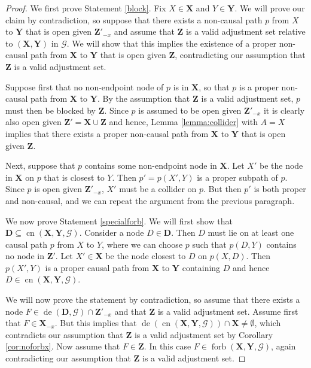 \documentclass[11pt,a4paper]{article}
\theoremstyle{definition}
\theoremstyle{remark}
\DeclareMathOperator{\Forbb}{forb}
\DeclareMathOperator{\de}{de}
\DeclareMathOperator{\CN}{cn}
\newcommand{\g}[1][G]{\mathcal{#1}}
\newcommand{\fb}[2][X,Y]{\Forbb(\mathbf{#1},#2)}
\newcommand{\cnb}[2][X,Y]{\CN(\mathbf{#1},#2)}
\begin{document}
\begin{proof}
	We first prove Statement \ref{block}. Fix $X \in \mathbf{X}$ and $Y \in \mathbf{Y}$. We will prove our claim by contradiction, so suppose that there exists a non-causal path $p$ from $X$ to $\mathbf{Y}$ that is open given $\mathbf{Z'}_{-x}$ and assume that $\mathbf{Z}$ is a valid adjustment set relative to $(\mathbf{X,Y})$ in $\g$. We will show that this implies the existence of a proper non-causal path from $\mathbf{X}$ to $\mathbf{Y}$ that is open given $\mathbf{Z}$, contradicting our assumption that $\mathbf{Z}$ is a valid adjustment set.
	
	Suppose first that no non-endpoint node of $p$ is in $\mathbf{X}$, so that $p$ is a proper non-causal path from $\mathbf{X}$ to $\mathbf{Y}$. By the assumption that $\mathbf{Z}$ is a valid adjustment set, $p$ must then be blocked by $\mathbf{Z}$. Since $p$ is assumed to be open given $\mathbf{Z'}_{-x}$ it is clearly also open given $\mathbf{Z'}=\mathbf{X} \cup \mathbf{Z}$ and hence, Lemma \ref{lemma:collider} with $A=X$ implies that there exists a proper non-causal path from $\mathbf{X}$ to $\mathbf{Y}$ that is open given $\mathbf{Z}$.
	
	Next, suppose that $p$ contains some non-endpoint node in $\mathbf{X}$. Let $X'$ be the node in $\mathbf{X}$ on $p$ that is closest to $Y$. Then $p'=p(X',Y)$ is a proper subpath of $p$. Since $p$ is open given $\mathbf{Z'}_{-x}$, $X'$ must be a collider on $p$. But then $p'$ is both proper and non-causal, and we can repeat the argument from the previous paragraph.  
	
	
	We now prove Statement \ref{specialforb}. We will first show that $\mathbf{D} \subseteq \cnb{\g}$. Consider a node $D \in \mathbf{D}$. Then $D$ must lie on at least one causal path $p$ from $X$ to $Y$, where we can choose $p$ such that $p(D,Y)$ contains no node in $\mathbf{Z'}$. Let $X' \in \mathbf{X}$ be the node closest to $D$ on $p(X,D)$. Then $p(X',Y)$ is a proper causal path from $\mathbf{X}$ to $\mathbf{Y}$ containing $D$ and hence $D \in \cnb{\g}$.
	
	We will now prove the statement by contradiction, so assume that there exists a node $F \in \de(\mathbf{D},\g) \cap \mathbf{Z'}_{-x}$ and that $\mathbf{Z}$ is a valid adjustment set. Assume first that $F \in \mathbf{X}_{-x}$. But this implies that $\de(\cnb{\g}) \cap \mathbf{X} \neq \emptyset$, which contradicts our assumption that $\mathbf{Z}$ is a valid adjustment set by Corollary \ref{cor:noforbx}. Now assume that $F \in \mathbf{Z}$. In this case $F \in \fb{\g}$, again contradicting our assumption that $\mathbf{Z}$ is a valid adjustment set.
\end{proof}
\end{document}
